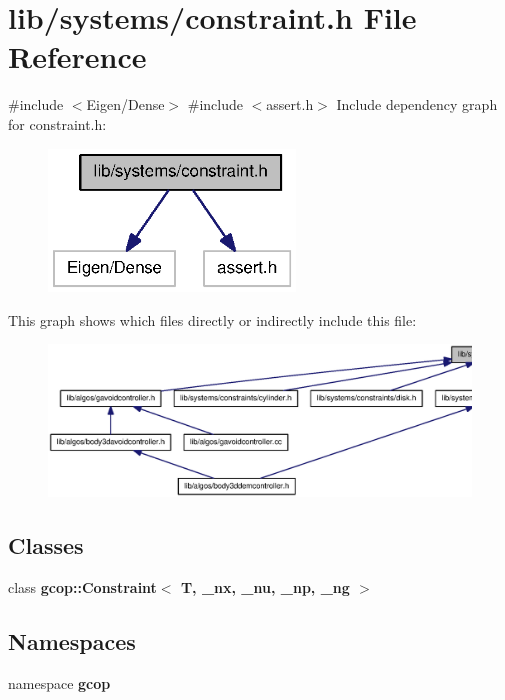 \section{lib/systems/constraint.h \-File \-Reference}
\label{constraint_8h}
{\ttfamily \#include $<$\-Eigen/\-Dense$>$}\*
{\ttfamily \#include $<$assert.\-h$>$}\*
\-Include dependency graph for constraint.\-h\-:
\nopagebreak
\begin{figure}[H]
\begin{center}
\leavevmode
\includegraphics[width=186pt]{constraint_8h__incl}
\end{center}
\end{figure}
\-This graph shows which files directly or indirectly include this file\-:
\nopagebreak
\begin{figure}[H]
\begin{center}
\leavevmode
\includegraphics[width=350pt]{constraint_8h__dep__incl}
\end{center}
\end{figure}
\subsection*{\-Classes}
\begin{DoxyCompactItemize}
\item 
class {\bf gcop\-::\-Constraint$<$ T, \-\_\-nx, \-\_\-nu, \-\_\-np, \-\_\-ng $>$}
\end{DoxyCompactItemize}
\subsection*{\-Namespaces}
\begin{DoxyCompactItemize}
\item 
namespace {\bf gcop}
\end{DoxyCompactItemize}
